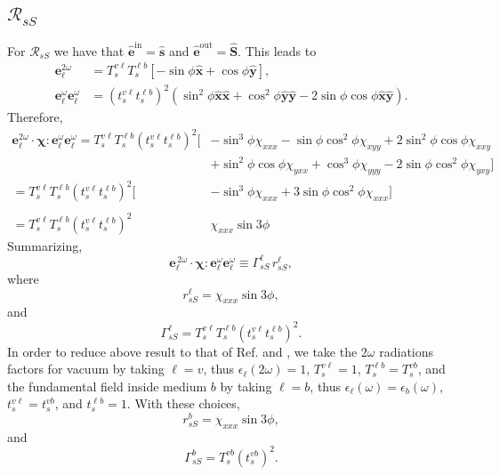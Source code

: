 \subsection{\texorpdfstring{$\mathcal{R}_{sS}$}{RsS}}

For $\mathcal{R}_{sS}$ we have that
$\hat{\mathbf{e}}^{\mathrm{in}}=\hat{\mathbf{s}}$ and
$\hat{\mathbf{e}}^{\mathrm{out}}=\hat{\mathbf{S}}$. This leads to
\begin{align*}
\mathbf{e}^{2\omega}_{\ell} 
&= T^{v\ell}_{s}T^{\ell b}_{s}
\left[-\sin\phi\hat{\mathbf{x}} + \cos\phi\hat{\mathbf{y}}\right],\\
\mathbf{e}^{\omega}_{\ell}\mathbf{e}^{\omega}_{\ell}
&= \left(t^{v\ell}_{s}t^{\ell b}_{s}\right)^{2}
\left(
  \sin^{2}\phi\hat{\mathbf{x}}\hat{\mathbf{x}}
+ \cos^{2}\phi\hat{\mathbf{y}}\hat{\mathbf{y}} 
- 2\sin\phi\cos\phi\hat{\mathbf{x}}\hat{\mathbf{y}}
\right).
\end{align*}
Therefore,
\begin{equation*}
\begin{split}
\mathbf{e}^{2\omega}_{\ell}
\cdot\boldsymbol{\chi}:
\mathbf{e}^{\omega}_{\ell}\mathbf{e}^{\omega}_{\ell} =
T^{v\ell}_{s}T^{\ell b}_{s}\left(t^{v\ell}_{s}t^{\ell b}_{s}\right)^{2}
\big[&
-  \sin^{3}\phi\chi_{xxx}
-  \sin\phi\cos^{2}\phi\chi_{xyy}
+ 2\sin^{2}\phi\cos\phi\chi_{xxy}\\
&+ \sin^{2}\phi\cos\phi\chi_{yxx}
+  \cos^{3}\phi\chi_{yyy}
- 2\sin\phi\cos^{2}\phi\chi_{yxy}
\big]\\
=
T^{v\ell}_{s}T^{\ell b}_{s}\left(t^{v\ell}_{s}t^{\ell b}_{s}\right)^{2}
\big[&
-  \sin^{3}\phi\chi_{xxx}
+ 3\sin\phi\cos^{2}\phi\chi_{xxx}
\big]\\\\
=T^{v\ell}_{s}T^{\ell b}_{s}\left(t^{v\ell}_{s}t^{\ell b}_{s}\right)^{2}
\,\,\,&\chi_{xxx}\sin3\phi
\end{split}
\end{equation*}
Summarizing,
\begin{equation*}
\mathbf{e}^{\,2\omega}_{\ell}\cdot
\boldsymbol{\chi}:\mathbf{e}^\omega_{\ell}\mathbf{e}^\omega_{\ell}
\equiv\Gamma^{\ell}_{sS}\, r^{\ell}_{sS},
\end{equation*}
where
\begin{equation*}
r^{\ell}_{sS} = \chi_{xxx}\sin3\phi,
\end{equation*}
and
\begin{equation*}
\Gamma^{\ell}_{sS}=
T^{v\ell}_{s}T^{\ell b}_{s}\left(t^{v\ell}_{s}t^{\ell b}_{s}\right)^{2}.
\end{equation*} 
In order to reduce above result to that of Ref. \cite{mizrahiJOSA88} and
\cite{sipePRB87}, we take the $2\omega$ radiations factors for vacuum by
taking $\ell=v$, thus $\epsilon_{\ell}(2\omega)=1$, $T^{v\ell}_{s}=1$,
$T^{\ell b}_{s}=T^{vb}_{s}$, and the fundamental field inside medium $b$ by
taking $\ell=b$, thus $\epsilon_{\ell}(\omega)=\epsilon_{b}(\omega)$,
$t^{v\ell}_{s}=t^{vb}_{s}$, and $t^{\ell b}_{s}=1$. With these choices,
\begin{equation*}
r^{b}_{sS} = \chi_{xxx}\sin3\phi,
\end{equation*}
and 
\begin{equation*}
\Gamma^{b}_{sS} = T^{vb}_{s}\left(t^{vb}_{s}\right)^{2}.
\end{equation*} 
